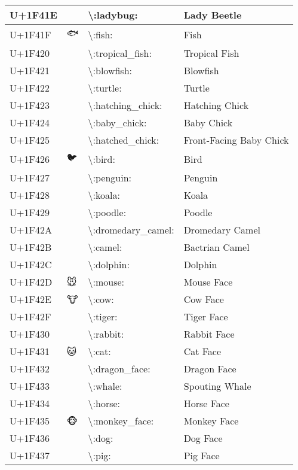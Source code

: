 \begin{table}[h]
\begin{tabulary}{\linewidth}{|L|L|L|L|}
\hline
U+1F41E & 🐞 & {\textbackslash}:ladybug: & Lady Beetle \\
\hline
U+1F41F & 🐟 & {\textbackslash}:fish: & Fish \\
\hline
U+1F420 & 🐠 & {\textbackslash}:tropical\_fish: & Tropical Fish \\
\hline
U+1F421 & 🐡 & {\textbackslash}:blowfish: & Blowfish \\
\hline
U+1F422 & 🐢 & {\textbackslash}:turtle: & Turtle \\
\hline
U+1F423 & 🐣 & {\textbackslash}:hatching\_chick: & Hatching Chick \\
\hline
U+1F424 & 🐤 & {\textbackslash}:baby\_chick: & Baby Chick \\
\hline
U+1F425 & 🐥 & {\textbackslash}:hatched\_chick: & Front-Facing Baby Chick \\
\hline
U+1F426 & 🐦 & {\textbackslash}:bird: & Bird \\
\hline
U+1F427 & 🐧 & {\textbackslash}:penguin: & Penguin \\
\hline
U+1F428 & 🐨 & {\textbackslash}:koala: & Koala \\
\hline
U+1F429 & 🐩 & {\textbackslash}:poodle: & Poodle \\
\hline
U+1F42A & 🐪 & {\textbackslash}:dromedary\_camel: & Dromedary Camel \\
\hline
U+1F42B & 🐫 & {\textbackslash}:camel: & Bactrian Camel \\
\hline
U+1F42C & 🐬 & {\textbackslash}:dolphin: & Dolphin \\
\hline
U+1F42D & 🐭 & {\textbackslash}:mouse: & Mouse Face \\
\hline
U+1F42E & 🐮 & {\textbackslash}:cow: & Cow Face \\
\hline
U+1F42F & 🐯 & {\textbackslash}:tiger: & Tiger Face \\
\hline
U+1F430 & 🐰 & {\textbackslash}:rabbit: & Rabbit Face \\
\hline
U+1F431 & 🐱 & {\textbackslash}:cat: & Cat Face \\
\hline
U+1F432 & 🐲 & {\textbackslash}:dragon\_face: & Dragon Face \\
\hline
U+1F433 & 🐳 & {\textbackslash}:whale: & Spouting Whale \\
\hline
U+1F434 & 🐴 & {\textbackslash}:horse: & Horse Face \\
\hline
U+1F435 & 🐵 & {\textbackslash}:monkey\_face: & Monkey Face \\
\hline
U+1F436 & 🐶 & {\textbackslash}:dog: & Dog Face \\
\hline
U+1F437 & 🐷 & {\textbackslash}:pig: & Pig Face \\

\end{tabulary}
\end{table}

